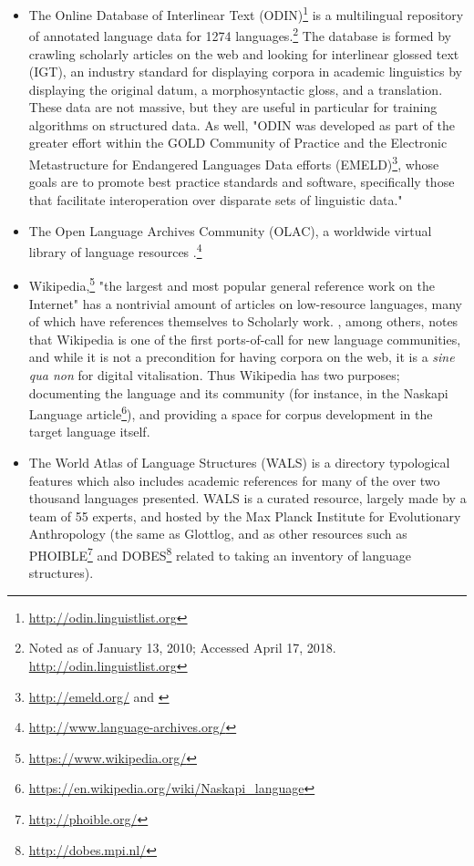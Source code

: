 \begin{itemize}
\item The Online Database of Interlinear Text (ODIN)\footnote{\href{http://odin.linguistlist.org}{http://odin.linguistlist.org}} is a multilingual repository of annotated language data for 1274 languages.\footnote{Noted as of January 13, 2010; Accessed April 17, 2018. \href{http://odin.linguistlist.org}{http://odin.linguistlist.org}} The database is formed by crawling scholarly articles on the web and looking for interlinear glossed text (IGT), an industry standard for displaying corpora in academic linguistics by displaying the original datum, a morphosyntactic gloss, and a translation. These data are not massive, but they are useful in particular for training algorithms on structured data. As well, "ODIN was developed as part of the greater effort within the GOLD Community of Practice \citep{farrar2007gold} and the Electronic Metastructure for Endangered Languages Data efforts (EMELD)\footnote{\href{http://emeld.org/}{http://emeld.org/} and \citet{farrar2002common}}, whose goals are to promote best practice standards and software, specifically those that facilitate interoperation over disparate sets of linguistic data." \citep{lewis2010developing}

\item The Open Language Archives Community (OLAC), a worldwide virtual library of language resources \citep{simons2003open}.\footnote{\href{http://www.language-archives.org/}{http://www.language-archives.org/}}

\item Wikipedia,\footnote{\href{https://www.wikipedia.org/}{https://www.wikipedia.org/}} "the largest and most popular general reference work on the Internet" \citep{wiki:Wikipedia} has a nontrivial amount of articles on low-resource languages, many of which have references themselves to Scholarly work. \citet{kornai2013digital}, among others, notes that Wikipedia is one of the first ports-of-call for new language communities, and while it is not a precondition for having corpora on the web, it is a {\it sine qua non} for digital vitalisation. Thus Wikipedia has two purposes; documenting the language and its community (for instance, in the Naskapi Language article\footnote{\href{https://en.wikipedia.org/wiki/Naskapi\_language}{https://en.wikipedia.org/wiki/Naskapi\_language}}), and providing a space for corpus development in the target language itself.

\item The World Atlas of Language Structures (WALS) is a directory typological features which also includes academic references for many of the over two thousand languages presented. WALS is a curated resource, largely made by a team of 55 experts, and hosted by the Max Planck Institute for Evolutionary Anthropology (the same as Glottlog, and as other resources such as PHOIBLE\footnote{\href{http://phoible.org/}{http://phoible.org/}} \citep{phoible} and DOBES\footnote{\href{http://dobes.mpi.nl/}{http://dobes.mpi.nl/}} \citep{wittenburg2003dobes} related to taking an inventory of language structures). \citep{wals}


\end{itemize}
